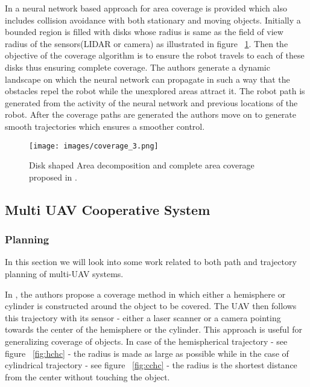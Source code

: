In \cite{5} a neural network based approach for area coverage is provided which also includes collision avoidance with both stationary and moving objects. Initially a bounded region is filled with disks whose radius is same as the field of view radius of the sensors(LIDAR or camera) as illustrated in figure ~\ref{fig:dcdcd}. Then the objective of the coverage algorithm is to ensure the robot travels to each of these disks thus ensuring complete coverage. The authors generate a dynamic landscape on which the neural network can propagate in such a way that the obstacles repel the robot while the unexplored areas attract it. The robot path is generated from the activity of the neural network and previous locations of the robot. After the coverage paths are generated the authors move on to generate smooth trajectories which ensures a smoother control.

\begin{figure}[htbp] %
 \centering
   \texttt{[image: images/coverage\_3.png]}
   \caption[Disk shaped Area decomposition and complete area coverage  \cite{5}]
   {Disk shaped Area decomposition and complete area coverage proposed in \cite{5}.}
   \label{fig:dcdcd}
\end{figure}

\pagebreak

\subsection{Multi UAV Cooperative System}
\subsubsection{Planning}
 In this section we will look into some work related to both path and trajectory planning of multi-UAV systems. 

In \cite{6}, the authors propose a coverage method in which either a hemisphere or cylinder is constructed around the object to be covered. The UAV then follows this trajectory with its sensor - either a laser scanner or a camera pointing towards the center of the hemisphere or the cylinder. This approach is useful for generalizing coverage of objects. In case of the hemispherical trajectory - see figure ~\ref{fig:hchc} - the radius is made as large as possible while in the case of cylindrical trajectory - see figure ~\ref{fig:cchc} - the radius is the shortest distance from the center without touching the object. 

